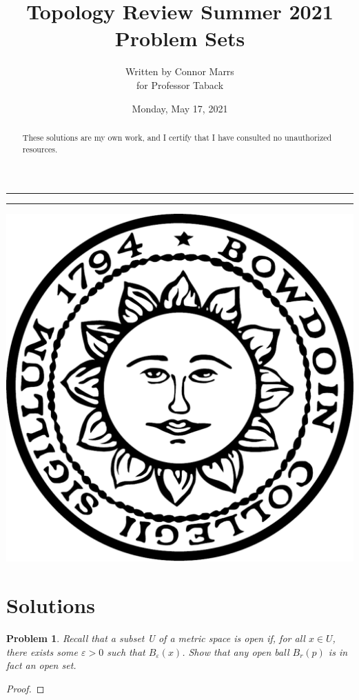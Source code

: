 \documentclass[11pt]{article}
\title{Topology Review Summer 2021\\Problem Sets}
\date{Monday, May 17, 2021}
\author{Written by Connor Marrs\\for Professor Taback}
\newcommand{\<}{\langle}
\renewcommand{\>}{\rangle}
\newtheorem{problem}{Problem}[section]
\newenvironment{fprob}
  {\begin{fcolor}\begin{problem}}
  {\end{problem}\end{fcolor}}
\theoremstyle{definition}
\begin{document}
\begin{titlepage}
\maketitle
\noindent\rule{\textwidth}{1pt}
\begin{abstract}
    These solutions are my own work, and I certify that I have consulted no unauthorized resources.
\end{abstract} 
\noindent\rule{\textwidth}{1pt}

 \begin{center}
    \includegraphics[scale = 0.15]{Bowdoin_Seal.png}
\end{center}

\end{titlepage}

\section{Solutions}
\begin{fprob}
    Recall that a subset U of a metric space is open if, for all $x\in U$, there exists some
    $\varepsilon >0$ such that $B_{\varepsilon}(x)$. Show that any open ball $B_r(p)$ is in fact an open set.
\end{fprob}
\begin{proof}
\end{proof}
\end{document}
